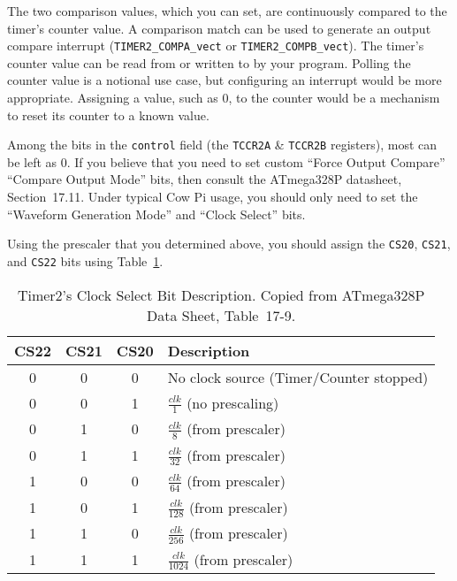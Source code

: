 The two comparison values, which you can set, are continuously compared to the timer's counter value.
A comparison match can be used to generate an output compare interrupt (\lstinline{TIMER2_COMPA_vect} or \lstinline{TIMER2_COMPB_vect}).
The timer's counter value can be read from or written to by your program.
Polling the counter value is a notional use case, but configuring an interrupt would be more appropriate.
Assigning a value, such as 0, to the counter would be a mechanism to reset its counter to a known value.

Among the bits in the \lstinline{control} field (the \texttt{TCCR2A} \& \texttt{TCCR2B} registers), most can be left as 0.
If you believe that you need to set custom ``Force Output Compare'' ``Compare Output Mode'' bits, then consult the ATmega328P datasheet, Section~17.11.\cite{ATmega328P}
Under typical Cow Pi usage, you should only need to set the ``Waveform Generation Mode'' and ``Clock Select'' bits.

Using the prescaler that you determined above, you should assign the \texttt{CS20}, \texttt{CS21}, and \texttt{CS22} bits using Table~\ref{tab:timer2clockselect}.

\begin{table}[h]
    \centering \small
    \begin{tabular}{|c|c|c|l|} \hline
    \textbf{CS22}   & \textbf{CS21} & \textbf{CS20} & \textbf{Description}                      \\ \hline\hline
    0               & 0             & 0             & No clock source (Timer/Counter stopped)   \\ \hline
    0               & 0             & 1             & $\frac{clk}{1}$ (no prescaling)           \\ \hline
    0               & 1             & 0             & $\frac{clk}{8}$ (from prescaler)          \\ \hline
    0               & 1             & 1             & $\frac{clk}{32}$ (from prescaler)         \\ \hline
    1               & 0             & 0             & $\frac{clk}{64}$ (from prescaler)         \\ \hline
    1               & 0             & 1             & $\frac{clk}{128}$ (from prescaler)        \\ \hline
    1               & 1             & 0             & $\frac{clk}{256}$ (from prescaler)        \\ \hline
    1               & 1             & 1             & $\frac{clk}{1024}$ (from prescaler)       \\ \hline
    \end{tabular}
    \caption{Timer2's Clock Select Bit Description. \tiny Copied from ATmega328P Data Sheet, Table~17\mbox{-}9.\cite{ATmega328P} \label{tab:timer2clockselect}}
\end{table}

